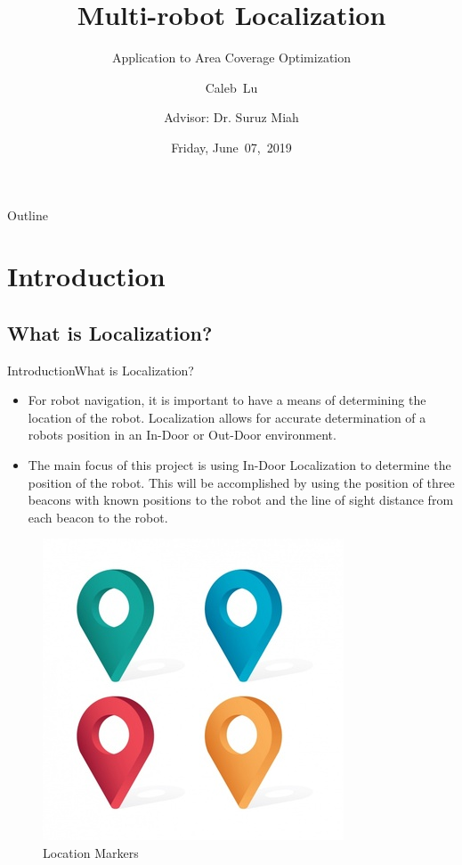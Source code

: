 \documentclass{beamer}
\title[Multi-Robot Localization]{Multi-robot Localization}
\subtitle{Application to Area Coverage Optimization}
\author[C.~Lu]{Caleb~Lu  \\\and
Advisor: Dr. Suruz Miah}
\institute[Bradley University] %
{
  Department of Electrical and Computer Engineering\\
  Bradley University\\
  1501 W. Bradley Avenue\\
  Peoria, IL, 61625, USA
}
\date[June~7,~2019]{Friday, June~07,~2019}
\begin{document}
\begin{frame}
  \titlepage
\end{frame}

\begin{frame}{Outline}
  \tableofcontents
  \setcounter{tocdepth}{1}
\end{frame}

\section{Introduction}
\subsection{What is Localization?}
\begin{frame}{Introduction}{What is Localization?}
  
\begin{itemize}
  \item
   For robot navigation, it is important to have a means of determining the location of the robot. Localization allows for accurate determination of a robots position in an In-Door or Out-Door environment.
   \item
    The main focus of this project is using In-Door Localization to determine the position of the robot. This will be accomplished by using the position of three beacons with known positions to the robot and the line of sight distance from each beacon to the robot.
  \end{itemize}
  \begin{figure}
  \includegraphics[scale=0.2]{figs/img/Lu_Images/locationIcon}
  \caption{Location Markers}
  \end{figure}
  
\end{frame}
\end{document}
